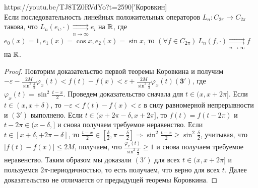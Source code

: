 \begin{linkthm}{https://youtu.be/TJ8TZ0RVdYo?t=2590}[$'$Коровкин]\ \\
Если последовательность линейных положительных операторов $L_n: C_{2\pi}\to C_{2\pi}$ такова, что $L_n(e_i,\cdot)\underset{n\to\infty}{\rightrightarrows}e_i$ на $\mathbb{R}$, где $e_0(x)=1, e_1(x)=\cos x, e_2(x)=\sin x$, то $(\forall f\in C_{2\pi})\  L_n(f,\cdot)\underset{n\to\infty}{\rightrightarrows} f$ на $\mathbb{R}$.
\end{linkthm}

\begin{proof}
Повторим доказательство первой теоремы Коровкина и получим $ {-\varepsilon-\frac{2M}{\sin^2\frac{\delta}{2}}\varphi_x(t)<f(t)-f(x)<\varepsilon+\frac{2M}{\sin^2\frac{\delta}{2}}\varphi_x(t)}\boldsymbol{(3')}$, где $\varphi_x(t)=\sin^2\frac{t-x}{2}$. Проведем доказательство сначала для $t\in(x,x+2\pi]$. Если $t\in(x,x+\delta)$, то $-\varepsilon<f(t)-f(x)<\varepsilon$ в силу равномерной непрерывности и $(3')$ выполнено. Если $t\in(x+2\pi-\delta, x+2\pi]$, то $f(t)=f(t-2\pi)$ и $t-2\pi\in(x-\delta,]$ и снова получаем требуемое неравенство. Если $t\in[x+\delta, +2\pi-\delta]$, то $\frac{t-x}{2}\in\left[\frac{\delta}{2}, \pi-\frac{\delta}{2}\right]\Rightarrow\sin^2\frac{t-x}{2}\geqslant\sin^2\frac{\delta}{2}$, учитывая, что $|f(t)-f(x)|\leqslant 2M$, получаем, что $\frac{\varphi_x(t)}{\sin^2\frac{\delta}{2}}\geqslant 1$ и снова получаем требуемое неравенство. Таким образом мы доказали $(3')$ для всех $t\in(x,x+2\pi]$ и пользуемся $2\pi$-периодичностью, то есть получаем, что верно для всех $t$. Далее доказательство не отличается от предыдущей теоремы Коровкина.
\end{proof}

